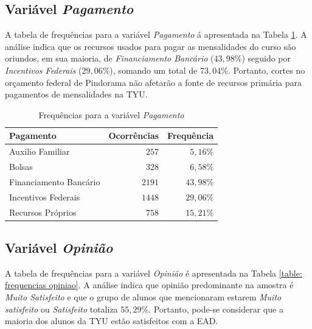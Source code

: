 \documentclass[10pt,a4paper,oneside]{article}
\begin{document}
\subsection*{Variável \textit{Pagamento}}

A tabela de frequências para a variável \textit{Pagamento} á apresentada na Tabela \ref{table: frequencias pagamento}. A análise indica que os recursos usados para pagar as mensalidades do curso são oriundos, em sua maioria, de \textit{Financiamento Bancário} ($43,98\%$) seguido por \textit{Incentivos Federais} ($29,06\%$), somando um total de $73,04\%$. Portanto, cortes no orçamento federal de Pindorama não afetarão a fonte de recursos primária para pagamentos de mensalidades na TYU.

\begin{table}[h]
\small
\centering
\caption{Frequências para a variável \textit{Pagamento}}
\label{table: frequencias pagamento}
\vspace{0.5em}
\begin{tabular}{l r r}
	\toprule
	\textbf{Pagamento}     & \textbf{Ocorrências} & \textbf{Frequência} \\
	\midrule
	Auxilio Familiar       & $257$                & $5,16\%$            \\
	Bolsas                 & $328$                & $6,58\%$            \\
	Financiamento Bancário & $2191$               & $43,98\%$           \\
	Incentivos Federais    & $1448$               & $29,06\%$           \\
	Recursos Próprios      & $758$                & $15,21\%$           \\
	\bottomrule
\end{tabular}
\end{table}

\subsection*{Variável \textit{Opinião}}

A tabela de frequências para a variável \textit{Opinião} é apresentada na Tabela \ref{table: frequencias opiniao}. A análise indica que opinião predominante na amostra é \textit{Muito Satisfeito} e que o grupo de alunos que mencionaram estarem \textit{Muito satisfeito} ou \textit{Satisfeito} totaliza $55,29\%$. Portanto, pode-se considerar que a maioria dos alunos da TYU estão satisfeitos com a EAD.
\end{document}
